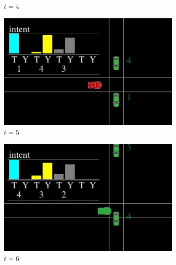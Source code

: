 \begin{figure}[!t]
\begin{subfigure}[b]{0.24\textwidth}
         \caption{$t=4$}
     \end{subfigure}
     \hfill
     \begin{subfigure}[b]{0.24\textwidth}
         \centering
         \includegraphics[width=0.99\textwidth]{figures/intent_distribution/screenshot_7.jpeg}
         \caption{$t=5$}
     \end{subfigure}
     \hfill
     \begin{subfigure}[b]{0.24\textwidth}
         \centering
         \includegraphics[width=0.99\textwidth]{figures/intent_distribution/screenshot_8.jpeg}
         \caption{$t=6$}
     \end{subfigure}
     \begin{subfigure}[b]{0.24\textwidth}
         \centering

\end{subfigure}
\end{figure}
